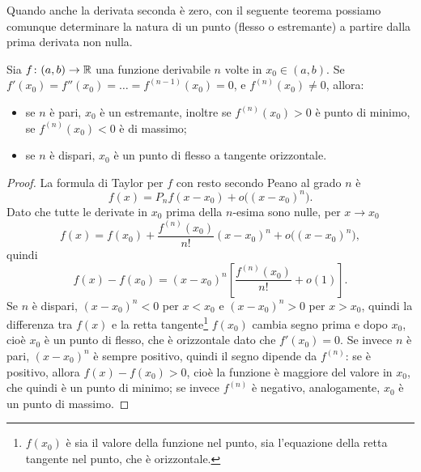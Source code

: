 Quando anche la derivata seconda è zero, con il seguente teorema possiamo comunque determinare la natura di un punto (flesso o estremante) a partire dalla prima derivata non nulla.
\begin{teorema}
Sia $f\colon(a,b)\to\mathbb{R}$ una funzione derivabile $n$ volte in $x_0\in(a,b)$. Se $f'(x_0)=f''(x_0)=\dots=f^{(n-1)}(x_0)=0$, e $f^{(n)}(x_0)\neq0$, allora:
\begin{itemize}
\item se $n$ è pari, $x_0$ è un estremante, inoltre se $f^{(n)}(x_0)>0$ è punto di minimo, se $f^{(n)}(x_0)<0$ è di massimo;
\item se $n$ è dispari, $x_0$ è un punto di flesso a tangente orizzontale.
\end{itemize}
\end{teorema}
\begin{proof}
La formula di Taylor per $f$ con resto secondo Peano al grado $n$ è
\[
f(x)=P_nf(x-x_0)+o\big((x-x_0)^n\big).
\]
Dato che tutte le derivate in $x_0$ prima della $n$-esima sono nulle, per $x\to x_0$
\[
f(x)=f(x_0)+\frac{f^{(n)}(x_0)}{n!}(x-x_0)^n+o\big((x-x_0)^n\big),
\]
quindi
\[
f(x)-f(x_0)=(x-x_0)^n\left[\frac{f^{(n)}(x_0)}{n!}+o(1)\right].
\]
Se $n$ è dispari, $(x-x_0)^n<0$ per $x<x_0$ e $(x-x_0)^n>0$ per $x>x_0$, quindi la differenza tra $f(x)$ e la retta tangente\footnote{$f(x_0)$ è sia il valore della funzione nel punto, sia l'equazione della retta tangente nel punto, che è orizzontale.} $f(x_0)$ cambia segno prima e dopo $x_0$, cioè $x_0$ è un punto di flesso, che è orizzontale dato che $f'(x_0)=0$.
Se invece $n$ è pari, $(x-x_0)^n$ è sempre positivo, quindi il segno dipende da $f^{(n)}$: se è positivo, allora $f(x)-f(x_0)>0$, cioè la funzione è maggiore del valore in $x_0$, che quindi è un punto di minimo; se invece $f^{(n)}$ è negativo, analogamente, $x_0$ è un punto di massimo.
\end{proof}
